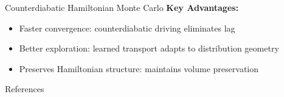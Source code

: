 \documentclass[final]{beamer}
\newlength{\sepwidth}
\newlength{\colwidth}
\newcommand{\separatorcolumn}{\begin{column}{\sepwidth}\end{column}}
\begin{document}
\begin{frame}[t]
\begin{columns}[t]
\begin{column}{\colwidth}
\begin{block}{Counterdiabatic Hamiltonian Monte Carlo}
\textbf{Key Advantages:}
\begin{itemize}
\item Faster convergence: counterdiabatic driving eliminates lag
\item Better exploration: learned transport adapts to distribution geometry
\item Preserves Hamiltonian structure: maintains volume preservation
\end{itemize}

\begin{center}
\end{center}

\end{block}




  
  



  \begin{block}{References}

    \nocite{*}
    \footnotesize{}

  \end{block}

\end{column}

\separatorcolumn
\end{columns}
\end{frame}
\end{document}
